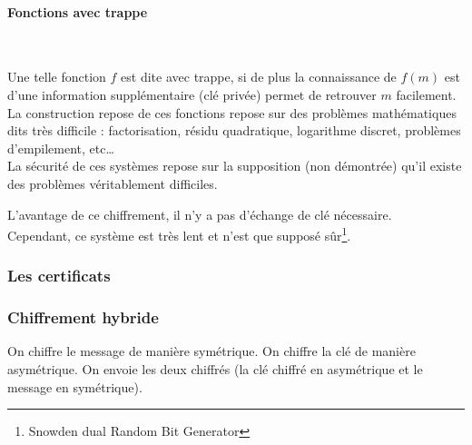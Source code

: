 \paragraph{Fonctions avec trappe}~\\\par
Une telle fonction $f$ est dite avec trappe, si de plus la connaissance de $f(m)$ est d'une information supplémentaire (clé privée) permet de retrouver $m$ facilement.\\
La construction repose de ces fonctions repose sur des problèmes mathématiques dits très difficile : factorisation, résidu quadratique, logarithme discret, problèmes d’empilement, etc\ldots\\
La sécurité de ces systèmes repose sur la supposition (non démontrée) qu'il existe des problèmes véritablement difficiles.\\\par
L'avantage de ce chiffrement, il n'y a pas d'échange de clé nécessaire.\\
Cependant, ce système est très lent et n'est que supposé sûr\footnote{Snowden dual Random Bit Generator}.
\subsubsection{Les certificats}

\subsubsection{Chiffrement hybride}
On chiffre le message de manière symétrique. On chiffre la clé de manière asymétrique. On envoie les deux chiffrés (la clé chiffré en asymétrique et le message en symétrique).
